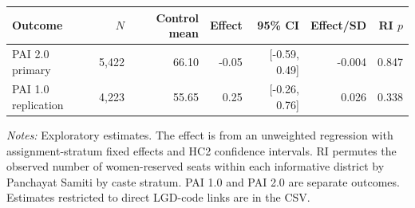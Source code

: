 \begin{tabular}{lrrrrrr}
\toprule
Outcome & $N$ & Control mean & Effect & 95\% CI & Effect/SD & RI $p$ \\
\midrule
PAI 2.0 primary & 5,422 & 66.10 & -0.05 & [-0.59, 0.49] & -0.004 & 0.847 \\
PAI 1.0 replication & 4,223 & 55.65 & 0.25 & [-0.26, 0.76] & 0.026 & 0.338 \\
\bottomrule
\end{tabular}
\parbox{\linewidth}{\scriptsize \emph{Notes:} Exploratory estimates. The effect is from an unweighted regression with assignment-stratum fixed effects and HC2 confidence intervals. RI permutes the observed number of women-reserved seats within each informative district by Panchayat Samiti by caste stratum. PAI 1.0 and PAI 2.0 are separate outcomes. Estimates restricted to direct LGD-code links are in the CSV.}

